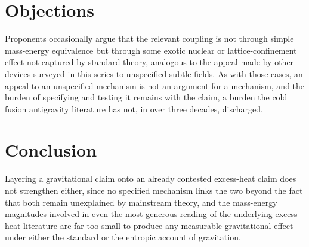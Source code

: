 \documentclass[11pt]{article}
\begin{document}
\section{Objections}

Proponents occasionally argue that the relevant coupling is not through simple mass-energy equivalence but through some exotic nuclear or lattice-confinement effect not captured by standard theory, analogous to the appeal made by other devices surveyed in this series to unspecified subtle fields. As with those cases, an appeal to an unspecified mechanism is not an argument for a mechanism, and the burden of specifying and testing it remains with the claim, a burden the cold fusion antigravity literature has not, in over three decades, discharged.

\section{Conclusion}

Layering a gravitational claim onto an already contested excess-heat claim does not strengthen either, since no specified mechanism links the two beyond the fact that both remain unexplained by mainstream theory, and the mass-energy magnitudes involved in even the most generous reading of the underlying excess-heat literature are far too small to produce any measurable gravitational effect under either the standard or the entropic account of gravitation.
\end{document}
